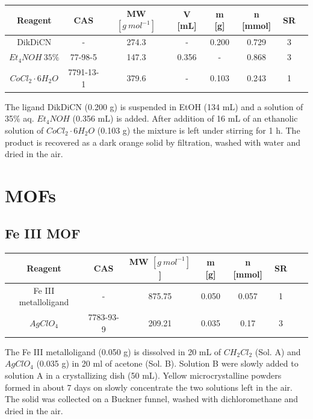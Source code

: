 \documentclass[../Master.tex]{subfiles}
\begin{document}
\begin{center}
	\begin{tabular}[b]{cccccccc}
		\toprule
		Reagent                & CAS       & MW \([g \ mol^{-1}]\) & V [mL] & m [g] & n [mmol] & SR \\
		\midrule
		DikDiCN                & -         & 274.3                 & -      & 0.200 & 0.729    & 3  \\
		\(Et_{4}NOH \ 35\%\)   & 77-98-5   & 147.3                 & 0.356  & -     & 0.868    & 3  \\
		$CoCl_{2} \cdot 6H_2O$ & 7791-13-1 & 379.6                 & -      & 0.103 & 0.243    & 1  \\
		\bottomrule
	\end{tabular}
\end{center}
The ligand DikDiCN (0.200 g) is suspended in EtOH (134 mL) and a solution of 35\% aq. \(Et_{4}NOH\) (0.356 mL) is added. After addition of 16 mL of an ethanolic solution of \(CoCl_2 \cdot 6H_2O\) (0.103 g) the mixture is left under stirring for 1 h. The product is recovered as a dark orange solid by filtration, washed with water and dried in the air.

\section{MOFs}
\subsection{Fe III MOF}

\begin{center}
	\begin{tabular}[b]{cccccccc}
		\toprule
		Reagent              & CAS       & MW \([g \ mol^{-1}]\) ] & m [g] & n [mmol] & SR \\
		\midrule
		Fe III metalloligand & -         & 875.75                  & 0.050 & 0.057    & 1  \\
		\(AgClO_{4}\)        & 7783-93-9 & 209.21                  & 0.035 & 0.17     & 3  \\
		\bottomrule
	\end{tabular}
\end{center}

The Fe III metalloligand (0.050 g) is dissolved in 20 mL of \(CH_{2}Cl_{2}\) (Sol. A) and \(AgClO_{4}\) (0.035 g) in 20 ml of acetone (Sol. B). Solution B were slowly added to solution A in a crystallizing dish (50 mL). Yellow microcrystalline powders formed in about 7 days on slowly concentrate the two solutions left in the air. The solid was collected on a Buckner funnel, washed with dichloromethane and dried in the air.
\end{document}

